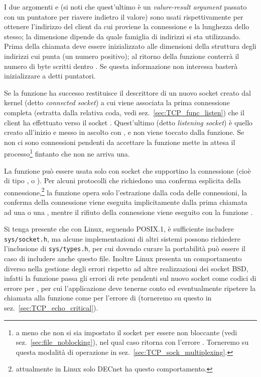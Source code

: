 I due argomenti  e  (si noti che quest'ultimo è un
\textit{valure-result argument} passato con un puntatore per riavere indietro
il valore) sono usati rispettivamente per ottenere l'indirizzo del client da
cui proviene la connessione e la lunghezza dello stesso; la dimensione dipende
da quale famiglia di indirizzi si sta utilizzando.  Prima della
chiamata  deve essere inizializzato alle dimensioni della
struttura degli indirizzi cui punta  (un numero positivo); al
ritorno della funzione  conterrà il numero di byte scritti
dentro . Se questa informazione non interessa basterà
inizializzare a  detti puntatori.

Se la funzione ha successo restituisce il descrittore di un nuovo socket
creato dal kernel (detto \textit{connected socket}) a cui viene associata la
prima connessione completa (estratta dalla relativa coda, vedi
sez.~\ref{sec:TCP_func_listen}) che il client ha effettuato verso il socket
. Quest'ultimo (detto \textit{listening socket}) è quello creato
all'inizio e messo in ascolto con , e non viene toccato dalla
funzione.  Se non ci sono connessioni pendenti da accettare la funzione mette
in attesa il processo\footnote{a meno che non si sia impostato il socket per
  essere non bloccante (vedi sez.~\ref{sec:file_noblocking}), nel qual caso
  ritorna con l'errore .  Torneremo su questa modalità di
  operazione in sez.~\ref{sec:TCP_sock_multiplexing}.}  fintanto che non ne
arriva una.

La funzione può essere usata solo con socket che supportino la connessione
(cioè di tipo ,  o
). Per alcuni protocolli che richiedono una conferma
esplicita della connessione,\footnote{attualmente in Linux solo DECnet ha
  questo comportamento.} la funzione opera solo l'estrazione dalla coda delle
connessioni, la conferma della connessione viene eseguita implicitamente dalla
prima chiamata ad una  o una , mentre il rifiuto della
connessione viene eseguito con la funzione . 

Si tenga presente che con Linux, seguendo POSIX.1, è sufficiente includere
\texttt{sys/socket.h}, ma alcune implementazioni di altri sistemi possono
richiedere l'inclusione di \texttt{sys/types.h}, per cui dovendo curare la
portabilità può essere il caso di includere anche questo file.  Inoltre Linux
presenta un comportamento diverso nella gestione degli errori rispetto ad
altre realizzazioni dei socket BSD, infatti la funzione  passa
gli errori di rete pendenti sul nuovo socket come codici di errore per
, per cui l'applicazione deve tenerne conto ed eventualmente
ripetere la chiamata alla funzione come per l'errore di 
(torneremo su questo in sez.~\ref{sec:TCP_echo_critical}).

